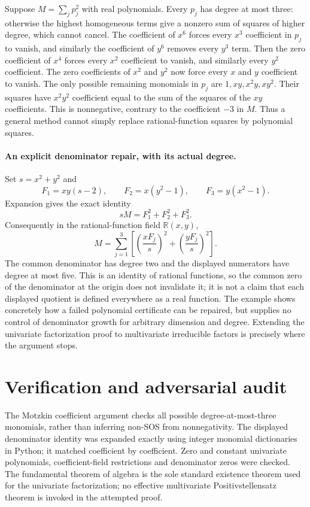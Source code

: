 \documentclass[11pt]{article}
\begin{document}
Suppose $M=\sum_j p_j^2$ with real polynomials. Every $p_j$ has degree at most three: otherwise the highest homogeneous terms give a nonzero sum of squares of higher degree, which cannot cancel. The coefficient of $x^6$ forces every $x^3$ coefficient in $p_j$ to vanish, and similarly the coefficient of $y^6$ removes every $y^3$ term. Then the zero coefficient of $x^4$ forces every $x^2$ coefficient to vanish, and similarly every $y^2$ coefficient. The zero coefficients of $x^2$ and $y^2$ now force every $x$ and $y$ coefficient to vanish. The only possible remaining monomials in $p_j$ are $1,xy,x^2y,xy^2$. Their squares have $x^2y^2$ coefficient equal to the sum of the squares of the $xy$ coefficients. This is nonnegative, contrary to the coefficient $-3$ in $M$. Thus a general method cannot simply replace rational-function squares by polynomial squares.

\paragraph{An explicit denominator repair, with its actual degree.}
Set $s=x^2+y^2$ and
\[
 F_1=xy(s-2),\qquad F_2=x(y^2-1),\qquad F_3=y(x^2-1).
\]
Expansion gives the exact identity
\[
 sM=F_1^2+F_2^2+F_3^2.
\]
Consequently in the rational-function field $\mathbb R(x,y)$,
\[
 M=\sum_{j=1}^3\left[\left(\frac{xF_j}{s}\right)^2+
                              \left(\frac{yF_j}{s}\right)^2\right].
\]
The common denominator has degree two and the displayed numerators have degree at most five. This is an identity of rational functions, so the common zero of the denominator at the origin does not invalidate it; it is not a claim that each displayed quotient is defined everywhere as a real function. The example shows concretely how a failed polynomial certificate can be repaired, but supplies no control of denominator growth for arbitrary dimension and degree. Extending the univariate factorization proof to multivariate irreducible factors is precisely where the argument stops.
\section{Verification and adversarial audit}
The Motzkin coefficient argument checks all possible degree-at-most-three monomials, rather than inferring non-SOS from nonnegativity. The displayed denominator identity was expanded exactly using integer monomial dictionaries in Python; it matched coefficient by coefficient. Zero and constant univariate polynomials, coefficient-field restrictions and denominator zeros were checked. The fundamental theorem of algebra is the sole standard existence theorem used for the univariate factorization; no effective multivariate Positivstellensatz theorem is invoked in the attempted proof.
\end{document}
